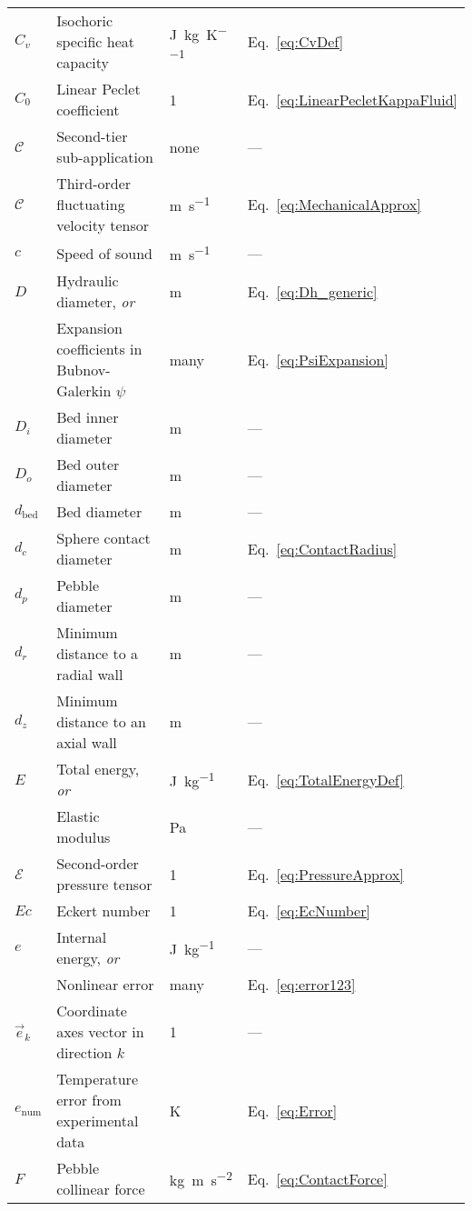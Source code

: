 \begin{longtable}{p{2cm}p{9cm}p{2cm}p{5cm}}
\(C_v\) & Isochoric specific heat capacity & \si{\joule\per\kilo\gram\per\kelvin} & Eq.\ \eqref{eq:CvDef}\\
\(C_0\) & Linear Peclet coefficient & 1 & Eq.\ \eqref{eq:LinearPecletKappaFluid}\\
\(\mathcal{C}\) & Second-tier sub-application & none & ---\\
\(\mathscr{C}\) & Third-order fluctuating velocity tensor & \si{\meter\per\second} & Eq.\ \eqref{eq:MechanicalApprox}\\
\(c\) & Speed of sound & \si{\meter\per\second} & ---\\
\(D\) & Hydraulic diameter, \textit{or} & \si{\meter} & Eq.\ \eqref{eq:Dh_generic}\\
& Expansion coefficients in Bubnov-Galerkin \(\psi\) & many & Eq.\ \eqref{eq:PsiExpansion}\\
\(D_i\) & Bed inner diameter & \si{\meter} & ---\\
\(D_o\) & Bed outer diameter & \si{\meter} & ---\\
\(d_\text{bed}\) & Bed diameter & \si{\meter} & ---\\
\(d_c\) & Sphere contact diameter & \si{\meter} & Eq.\ \eqref{eq:ContactRadius}\\
\(d_p\) & Pebble diameter & \si{\meter} & ---\\
\(d_r\) & Minimum distance to a radial wall & \si{\meter} & ---\\
\(d_z\) & Minimum distance to an axial wall & \si{\meter} & ---\\
\(E\) & Total energy, \textit{or} & \si{\joule\per\kilo\gram} & Eq.\ \eqref{eq:TotalEnergyDef}\\
 & Elastic modulus & \si{\pascal} & ---\\
 \(\mathscr{E}\) & Second-order pressure tensor & 1 & Eq.\ \eqref{eq:PressureApprox}\\
 \(Ec\) & Eckert number & 1 & Eq.\ \eqref{eq:EcNumber}\\
\(e\) & Internal energy, \textit{or} & \si{\joule\per\kilo\gram} & ---\\
& Nonlinear error & many & Eq.\ \eqref{eq:error123}\\
\(\vec{e}_k\) & Coordinate axes vector in direction \(k\) & 1 & ---\\
\(e_\text{num}\) & Temperature error from experimental data & \si{\kelvin} & Eq.\ \eqref{eq:Error}\\
\(F\) & Pebble collinear force & \si{\kilo\gram\meter\per\square\second} & Eq.\ \eqref{eq:ContactForce}\\

\end{longtable}
